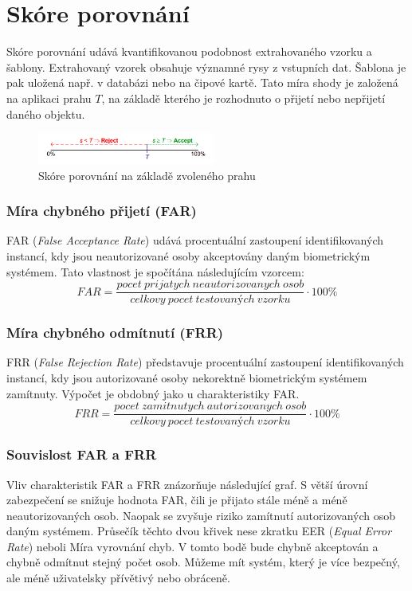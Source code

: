 \section{Skóre porovnání}
Skóre porovnání udává kvantifikovanou podobnost extrahovaného vzorku a šablony. Extrahovaný vzorek obsahuje významné rysy z vstupních dat. Šablona je pak uložená např. v databázi nebo na čipové kartě. Tato míra shody je založená na aplikaci prahu $T$, na základě kterého je rozhodnuto o přijetí nebo nepřijetí daného objektu. \cite{Drahansky}

\begin{figure}[!htbp]
    \centering
    \includegraphics[width=220px]{obrazky-figures/mira.png}
    \caption{Skóre porovnání na základě zvoleného prahu \cite{Drahansky}}
\end{figure}

\subsubsection{Míra chybného přijetí (FAR)}
FAR (\textit{False Acceptance Rate}) udává procentuální zastoupení identifikovaných instancí, kdy jsou neautorizované osoby akceptovány daným biometrickým systémem. Tato vlastnost je spočítána následujícím vzorcem:
$$FAR = \frac{pocet\:prijatych\:neautorizovanych\:osob}{celkovy\:pocet\:testovaných\:vzorku} \cdot 100 \%$$

\subsubsection{Míra chybného odmítnutí (FRR)}
FRR (\textit{False Rejection Rate}) představuje procentuální zastoupení identifikovaných instancí, kdy jsou autorizované osoby nekorektně biometrickým systémem zamítnuty. Výpočet je obdobný jako u charakteristiky FAR.
$$FRR = \frac{pocet\:zamitnutych\:autorizovanych\:osob}{celkovy\:pocet\:testovaných\:vzorku} \cdot 100 \%$$

\subsubsection{Souvislost FAR a FRR}
Vliv charakteristik FAR a FRR znázorňuje následující graf. S větší úrovní zabezpečení se snižuje hodnota FAR, čili je přijato stále méně a méně neautorizovaných osob. Naopak se zvyšuje riziko zamítnutí autorizovaných osob daným systémem. Průsečík těchto dvou křivek nese zkratku EER (\textit{Equal Error Rate}) neboli Míra vyrovnání chyb. V tomto bodě bude chybně akceptován a chybně odmítnut stejný počet osob. Můžeme mít systém, který je více bezpečný, ale méně uživatelsky přívětivý nebo obráceně. \cite{FARFRR}

